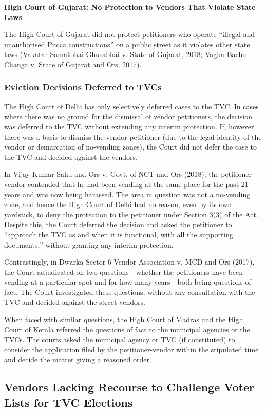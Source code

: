 \documentclass[a4paper, 12pt, twoside]{article}
\begin{document}
\textbf{High Court of Gujarat: No Protection to Vendors That Violate State Laws}

The High Court of Gujarat did not protect petitioners who operate “illegal and unauthorised Pucca constructions” on a public street as it violates other state laws (Vakatar Samatbhai Ghusabhai v. State of Gujarat, 2018; Vagha Bachu Changa v. State of Gujarat and Ors, 2017).

\subsubsection{Eviction Decisions Deferred to TVCs}

The High Court of Delhi has only selectively deferred cases to the TVC. In cases where there was no ground for the dismissal of vendor petitioners, the decision was deferred to the TVC without extending any interim protection. If, however, there was a basis to dismiss the vendor petitioner (due to the legal identity of the vendor or demarcation of no-vending zones), the Court did not defer the case to the TVC and decided against the vendors. 

In Vijay Kumar Sahu and Ors v. Govt. of NCT and Ors (2018), the petitioner-vendor contended that he had been vending at the same place for the past 21 years and was now being harassed. The area in question was not a no-vending zone, and hence the High Court of Delhi had no reason, even by its own yardstick, to deny the protection to the petitioner under Section 3(3) of the Act. Despite this, the Court deferred the decision and asked the petitioner to “approach the TVC as and when it is functional, with all the supporting documents,” without granting any interim protection.

Contrastingly, in Dwarka Sector 6 Vendor Association v. MCD and Ors (2017), the Court adjudicated on two questions—whether the petitioners have been vending at a particular spot and for how many years—both being questions of fact. The Court investigated these questions, without any consultation with the TVC and decided against the street vendors. 

When faced with similar questions, the High Court of Madras and the High Court of Kerala referred the questions of fact to the municipal agencies or the TVCs. The courts asked the municipal agency or TVC (if constituted) to consider the application filed by the petitioner-vendor within the stipulated time and decide the matter giving a reasoned order.

\subsection{Vendors Lacking Recourse to Challenge Voter Lists for TVC Elections}
\end{document}
